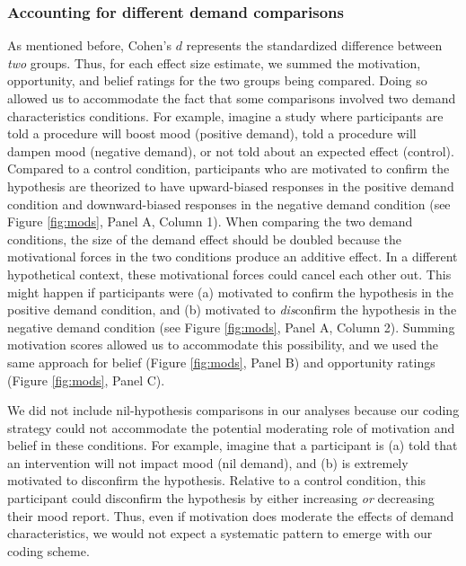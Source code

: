 \documentclass[
  man,floatsintext]{apa6}
\begin{document}
\hypertarget{accounting-for-different-demand-comparisons}{%
\subsubsection{Accounting for different demand comparisons}\label{accounting-for-different-demand-comparisons}}

As mentioned before, Cohen's \(d\) represents the standardized difference between \emph{two} groups. Thus, for each effect size estimate, we summed the motivation, opportunity, and belief ratings for the two groups being compared. Doing so allowed us to accommodate the fact that some comparisons involved two demand characteristics conditions. For example, imagine a study where participants are told a procedure will boost mood (positive demand), told a procedure will dampen mood (negative demand), or not told about an expected effect (control). Compared to a control condition, participants who are motivated to confirm the hypothesis are theorized to have upward-biased responses in the positive demand condition and downward-biased responses in the negative demand condition (see Figure \ref{fig:mods}, Panel A, Column 1). When comparing the two demand conditions, the size of the demand effect should be doubled because the motivational forces in the two conditions produce an additive effect. In a different hypothetical context, these motivational forces could cancel each other out. This might happen if participants were (a) motivated to confirm the hypothesis in the positive demand condition, and (b) motivated to \emph{dis}confirm the hypothesis in the negative demand condition (see Figure \ref{fig:mods}, Panel A, Column 2). Summing motivation scores allowed us to accommodate this possibility, and we used the same approach for belief (Figure \ref{fig:mods}, Panel B) and opportunity ratings (Figure \ref{fig:mods}, Panel C).

We did not include nil-hypothesis comparisons in our analyses because our coding strategy could not accommodate the potential moderating role of motivation and belief in these conditions. For example, imagine that a participant is (a) told that an intervention will not impact mood (nil demand), and (b) is extremely motivated to disconfirm the hypothesis. Relative to a control condition, this participant could disconfirm the hypothesis by either increasing \emph{or} decreasing their mood report. Thus, even if motivation does moderate the effects of demand characteristics, we would not expect a systematic pattern to emerge with our coding scheme.
\end{document}
